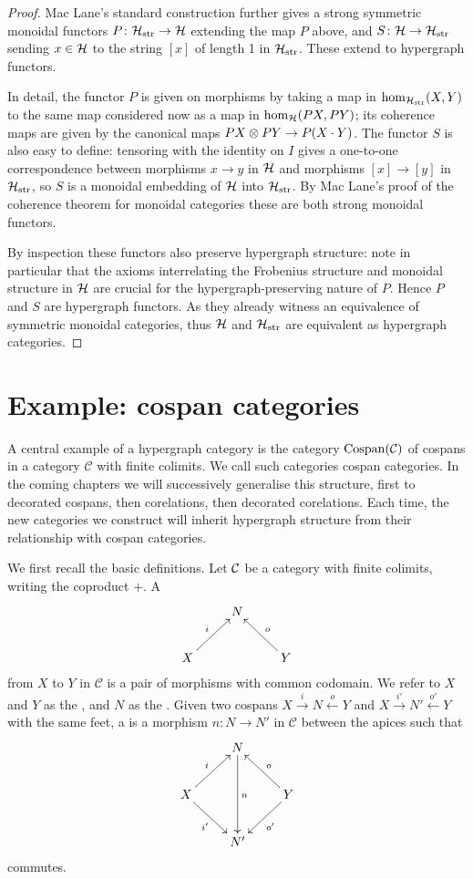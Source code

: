 \begin{proof}
  Mac Lane's standard construction further gives a strong symmetric monoidal
  functors $P{\colon} \mathcal H_{\mathrm{str}} \to \mathcal H$ extending the map $P$ above,
  and $S{\colon} \mathcal H \to \mathcal H_{\mathrm{str}}$ sending $x \in \mathcal H$ to the
  string $[x]$ of length 1 in $\mathcal H_{\mathrm{str}}$. These extend to hypergraph
  functors.

  In detail, the functor $P$ is given on morphisms by taking a map in
  $\mathrm{hom}_{\mathcal H_{\mathrm{str}}}(X,Y)$ to the same map considered now as a
  map in $\mathrm{hom}_{\mathcal H}(PX,PY)$; its coherence maps are given by the
  canonical maps $PX \otimes PY \to P(X\cdot Y)$. The functor $S$ is also easy to
  define: tensoring with the identity on $I$ gives a one-to-one correspondence
  between morphisms $x \to y$ in $\mathcal H$ and morphisms $[x] \to [y]$ in $\mathcal
  H_{\mathrm{str}}$, so $S$ is a monoidal embedding of $\mathcal H$ into $\mathcal
  H_{\mathrm{str}}$. By Mac Lane's proof of the coherence theorem for monoidal
  categories these are both strong monoidal functors. 
  
  By inspection these functors also preserve hypergraph structure: note in
  particular that the axioms interrelating the Frobenius structure and monoidal
  structure in $\mathcal H$ are crucial for the hypergraph-preserving nature of $P$.
  Hence $P$ and $S$ are hypergraph functors. As they already witness an
  equivalence of symmetric monoidal categories, thus $\mathcal H$ and $\mathcal
  H_{\mathrm{str}}$ are equivalent as hypergraph categories.
\end{proof}

\section{Example: cospan categories} \label{sec.cospans}

A central example of a hypergraph category is the category $\operatorname{{Cospan}}(\mathcal C)$
of cospans in a category $\mathcal C$ with finite colimits. We call such
categories cospan categories. In the coming chapters we will successively
generalise this structure, first to decorated cospans, then corelations, then
decorated corelations. Each time, the new categories we construct will inherit
hypergraph structure from their relationship with cospan categories.

We first recall the basic definitions. Let $\mathcal C$ be a category with finite
colimits, writing the coproduct $+$. A 
\[
  \xymatrix{
    & N \\
    X \ar[ur]^{i} && Y \ar[ul]_{o}
  }
\]
from $X$ to $Y$ in $\mathcal C$ is a pair of morphisms with common codomain. We
refer to $X$ and $Y$ as the , and $N$ as the .  Given
two cospans $X \stackrel{i}{\longrightarrow} N \stackrel{o}{\longleftarrow} Y$
and $X \stackrel{i'}{\longrightarrow} N' \stackrel{o'}{\longleftarrow} Y$ with
the same feet, a  is a morphism $n\colon  N \to N'$ in
$\mathcal C$ between the apices such that
\[
  \xymatrix{
    & N \ar[dd]^n  \\
    X \ar[ur]^{i} \ar[dr]_{i'} && Y \ar[ul]_{o} \ar[dl]^{o'}\\
    & N'
  }
\]
commutes.

